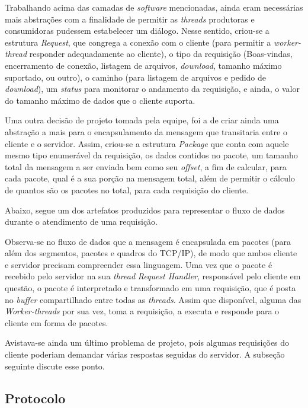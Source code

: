 \documentclass[12pt]{article}
\begin{document}
Trabalhando acima das camadas de \textit{software} mencionadas, ainda eram necessárias mais abstrações com a finalidade de permitir as \textit{threads} produtoras e consumidoras pudessem estabelecer um diálogo. Nesse sentido, criou-se a estrutura \textit{Request}, que congrega a conexão com o cliente (para permitir a \textit{worker-thread} responder adequadamente ao cliente), o tipo da requisição (Boas-vindas, encerramento de conexão, listagem de arquivos, \textit{download}, tamanho máximo suportado, ou outro), o caminho (para listagem de arquivos e pedido de \textit{download}), um \textit{status} para monitorar o andamento da requisição, e ainda, o valor do tamanho máximo de dados que o cliente suporta.

Uma outra decisão de projeto tomada pela equipe, foi a de criar ainda uma abstração a mais para o encapsulamento da mensagem que transitaria entre o cliente e o servidor. Assim, criou-se a estrutura \textit{Package} que conta com aquele mesmo tipo enumerável da requisição, os dados contidos no pacote, um tamanho total da mensagem a ser enviada bem como seu \textit{offset}, a fim de calcular, para cada pacote, qual é a sua porção na mensagem total, além de permitir o cálculo de quantos são os pacotes no total, para cada requisição do cliente.

Abaixo, segue um dos artefatos produzidos para representar o fluxo de dados durante o atendimento de uma requisição.

\newpage

Observa-se no fluxo de dados que a mensagem é encapsulada em pacotes (para além dos segmentos, pacotes e quadros do TCP/IP), de modo que ambos cliente e servidor precisam compreender essa linguagem. Uma vez que o pacote é recebido pelo servidor na sua \textit{thread} \textit{Request Handler}, responsável pelo cliente em questão, o pacote é interpretado e transformado em uma requisição, que é posta no \textit{buffer} compartilhado entre todas as \textit{threads}. Assim que disponível, alguma das \textit{Worker-threads} por sua vez, toma a requisição, a executa e responde para o cliente em forma de pacotes.

Avistava-se ainda um último problema de projeto, pois algumas requisições do cliente poderiam demandar várias respostas seguidas do servidor. A subseção seguinte discute esse ponto.

\subsection{Protocolo}
\end{document}
